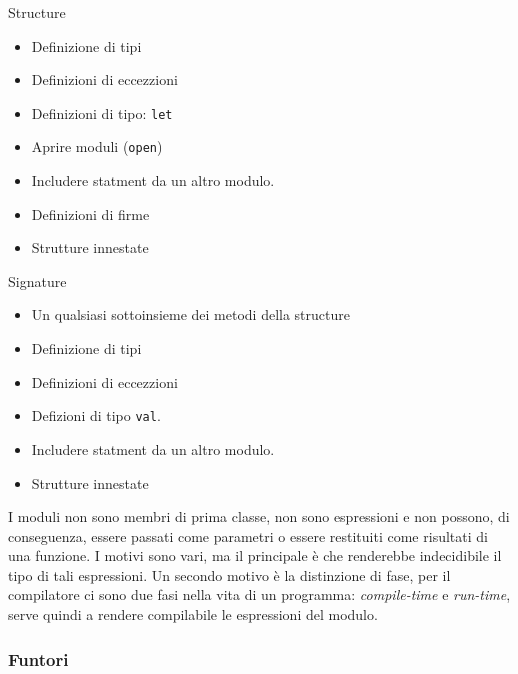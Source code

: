 \documentclass{article}
\begin{document}
\begin{minipage}{0.45\textwidth}

Structure

\begin{itemize}
  \item Definizione di tipi
  \item Definizioni di eccezzioni
  \item Definizioni di tipo: \texttt{let}
  \item Aprire moduli (\texttt{open})
  \item Includere statment da un altro modulo.
  \item Definizioni di firme
  \item Strutture innestate
\end{itemize}

\end{minipage}
\hfill
\begin{minipage}{0.45\textwidth}

Signature

\begin{itemize}
  \item Un qualsiasi sottoinsieme dei metodi della structure
  \item Definizione di tipi
  \item Definizioni di eccezzioni
  \item Defizioni di tipo \texttt{val}.
  \item Includere statment da un altro modulo.
  \item Strutture innestate
\end{itemize}

\end{minipage}

\vspace*{0.5cm}

\hspace*{0.5cm}I moduli non sono membri di prima classe, non sono espressioni e non possono, di conseguenza, essere passati come parametri o essere restituiti come risultati di una funzione.
I motivi sono vari, ma il principale è che renderebbe indecidibile il tipo di tali espressioni.
Un secondo motivo è la distinzione di fase, per il compilatore ci sono due fasi nella vita di un programma: \textit{compile-time} e \textit{run-time}, serve quindi a rendere compilabile le espressioni del modulo.

\subsubsection{Funtori}
\end{document}
